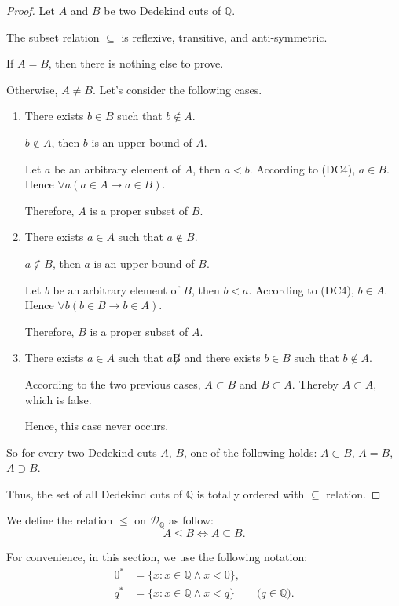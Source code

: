 \begin{proof}
    Let $A$ and $B$ be two Dedekind cuts of $\mathbb{Q}$.

    The subset relation $\subseteq$ is reflexive, transitive, and anti-symmetric.
    \bigskip

    If $A = B$, then there is nothing else to prove.

    Otherwise, $A\ne B$. Let's consider the following cases.

    \begin{enumerate}[label={\textbf{Case \arabic*.}},itemindent=0.5cm]
        \item There exists $b\in B$ such that $b\notin A$.

              $b\notin A$, then $b$ is an upper bound of $A$.

              Let $a$ be an arbitrary element of $A$, then $a < b$. According to (DC4), $a\in B$. Hence $\forall a(a\in A\rightarrow a\in B)$.

              Therefore, $A$ is a proper subset of $B$.
        \item There exists $a\in A$ such that $a\notin B$.

              $a\notin B$, then $a$ is an upper bound of $B$.

              Let $b$ be an arbitrary element of $B$, then $b < a$. According to (DC4), $b\in A$. Hence $\forall b(b\in B\rightarrow b\in A)$.

              Therefore, $B$ is a proper subset of $A$.
        \item There exists $a\in A$ such that $a\not B$ and there exists $b\in B$ such that $b\notin A$.

              According to the two previous cases, $A\subset B$ and $B\subset A$. Thereby $A\subset A$, which is false.

              Hence, this case never occurs.
    \end{enumerate}

    So for every two Dedekind cuts $A$, $B$, one of the following holds: $A\subset B$, $A = B$, $A\supset B$.

    Thus, the set of all Dedekind cuts of $\mathbb{Q}$ is totally ordered with $\subseteq$ relation.
\end{proof}

We define the relation $\le$ on $\mathscr{D}_{\mathbb{Q}}$ as follow:
\[
    A\le B \Longleftrightarrow A\subseteq B.
\]

For convenience, in this section, we use the following notation:
\[
    \begin{split}
        {0}^{*} & = \{ x : x\in\mathbb{Q} \land x < 0 \}, \\
        {q}^{*} & = \{ x : x\in\mathbb{Q} \land x < q \}\qquad\text{($q\in\mathbb{Q}$)}.
    \end{split}
\]

